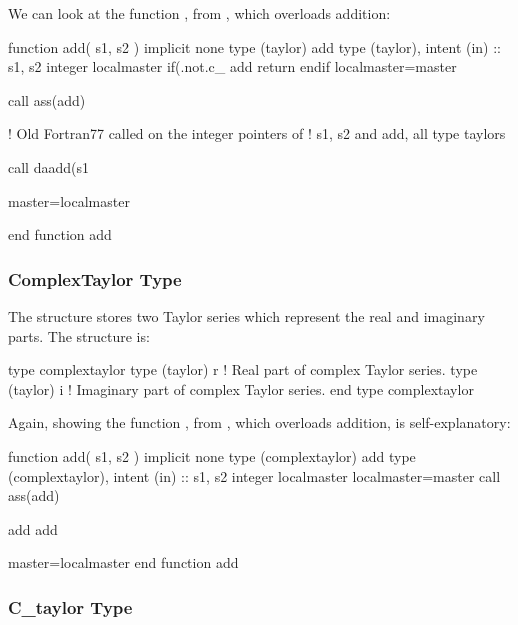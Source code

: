 \documentclass{hitec}     %
\begin{document}
{{{{{{{We can look at the function , from , which overloads addition:

\begin{code}
  function add( s1, s2 )
    implicit none
    type (taylor) add
    type (taylor), intent (in) :: s1, s2
    integer localmaster
    if(.not.c_%
       add%
      return
    endif
    localmaster=master

    call ass(add)
    
 ! Old Fortran77 called on the integer pointers of 
 ! s1, s2 and add, all type taylors
 
    call daadd(s1%

    master=localmaster

  end function add
  \end{code}
  
\subsubsection{ComplexTaylor Type}
\label{s:ctaylor}

The  structure stores two Taylor series which represent the real and imaginary parts.
The structure is:
\begin{code}
type complextaylor
   type (taylor) r     ! Real part of complex Taylor series.
   type (taylor) i     ! Imaginary part of complex Taylor series.
end type complextaylor
\end{code}

Again, showing the function , from , which overloads addition, is self-explanatory:

\begin{code}
  function add( s1, s2 )
    implicit none
    type (complextaylor) add
    type (complextaylor), intent (in) :: s1, s2
    integer localmaster
    localmaster=master
    call ass(add)
    
    add%
    add%
    
    master=localmaster
  end function add
\end{code}

 \subsubsection{C_taylor Type}\label{s:ctaylortype}
\label{s:ctaylor}

}}}}}}}
\end{document}
